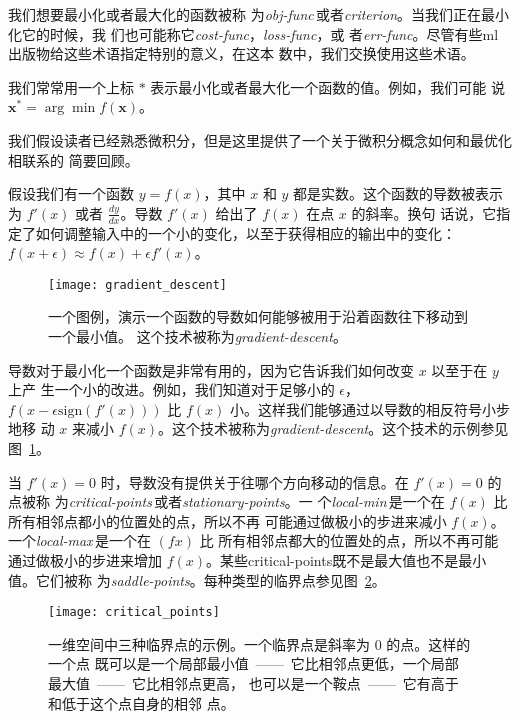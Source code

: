 我们想要最小化或者最大化的函数被称
为\emph{\gls{obj-func}}\,或者\emph{\gls{criterion}}。当我们正在最小化它的时候，我
们也可能称它\emph{\gls{cost-func}}，\emph{\gls{loss-func}}，或
者\emph{\gls{err-func}}。尽管有些\gls*{ml}出版物给这些术语指定特别的意义，在这本
数中，我们交换使用这些术语。

我们常常用一个上标 $*$ 表示最小化或者最大化一个函数的值。例如，我们可能
说 $\pmb{x}^* = \arg\min f(\pmb{x})$。

我们假设读者已经熟悉微积分，但是这里提供了一个关于微积分概念如何和最优化相联系的
简要回顾。

假设我们有一个函数 $y = f(x)$，其中 $x$ 和 $y$ 都是实数。这个函数的导数被表示
为 $f'(x)$ 或者 $\frac{dy}{dx}$。导数 $f'(x)$ 给出了 $f(x)$ 在点 $x$ 的斜率。换句
话说，它指定了如何调整输入中的一个小的变化，以至于获得相应的输出中的变化：$f(x +
\epsilon) \approx f(x) + \epsilon f'(x)$。

\begin{figure}[h]
  \centering
  \texttt{[image: gradient\_descent]}
  \caption{一个图例，演示一个函数的导数如何能够被用于沿着函数往下移动到一个最小值。
    这个技术被称为\emph{\gls{gradient-descent}}。\label{fig:gradient_descent}}
\end{figure}

导数对于最小化一个函数是非常有用的，因为它告诉我们如何改变 $x$ 以至于在 $y$ 上产
生一个小的改进。例如，我们知道对于足够小的 $\epsilon$，$f(x - \epsilon
\mathrm{sign}(f'(x)))$ 比 $f(x)$ 小。这样我们能够通过以导数的相反符号小步地移
动 $x$ 来减小
$f(x)$。这个技术被称为\emph{\gls{gradient-descent}}。这个技术的示例参见
图~\ref{fig:gradient_descent}。

当 $f'(x) = 0$ 时，导数没有提供关于往哪个方向移动的信息。在 $f'(x) = 0$ 的点被称
为\emph{\gls{critical-points}}\,或者\emph{\gls{stationary-points}}。一
个\emph{\gls{local-min}}\,是一个在 $f(x)$ 比所有相邻点都小的位置处的点，所以不再
可能通过做极小的步进来减小 $f(x)$。一个\emph{\gls{local-max}}\,是一个在 $(fx)$ 比
所有相邻点都大的位置处的点，所以不再可能通过做极小的步进来增加
$f(x)$。某些\gls*{critical-points}既不是最大值也不是最小值。它们被称
为\emph{\gls{saddle-points}}。每种类型的临界点参见图~\ref{fig:critical_points}。

\begin{figure}[h]
  \centering
  \texttt{[image: critical\_points]}
  \caption{一维空间中三种临界点的示例。一个临界点是斜率为 $0$ 的点。这样的一个点
    既可以是一个局部最小值~——~它比相邻点更低，一个局部最大值~——~它比相邻点更高，
    也可以是一个鞍点~——~它有高于和低于这个点自身的相邻
    点。\label{fig:critical_points}}
\end{figure}

